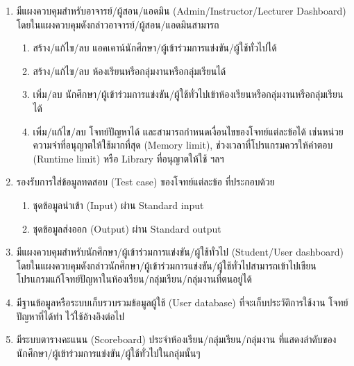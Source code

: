 \documentclass[12pt,one side,openright,a4paper]{cpe-thesis-th}
\begin{document}
\begin{enumerate}
    \item มีแผงควบคุมสำหรับอาจารย์/ผู้สอน/แอดมิน (Admin/Instructor/Lecturer Dashboard) โดยในแผงควบคุมดังกล่าวอาจารย์/ผู้สอน/แอดมินสามารถ
    \begin{enumerate}
        \item สร้าง/แก้ไข/ลบ แอคเคาน์นักศึกษา/ผู้เข้าร่วมการแข่งขัน/ผู้ใช้ทั่วไปได้
        \item สร้าง/แก้ไข/ลบ ห้องเรียนหรือกลุ่มงานหรือกลุ่มเรียนได้
        \item เพิ่ม/ลบ นักศึกษา/ผู้เข้าร่วมการแข่งขัน/ผู้ใช้ทั่วไปเข้าห้องเรียนหรือกลุ่มงานหรือกลุ่มเรียนได้
        \item เพิ่ม/แก้ไข/ลบ โจทย์ปัญหาได้ และสามารถกำหนดเงื่อนไขของโจทย์แต่ละข้อได้ เช่นหน่วยความจำที่อนุญาตให้ใช้มากที่สุด (Memory limit), ช่วงเวลาที่โปรแกรมควรให้คำตอบ (Runtime limit) หรือ Library ที่อนุญาตให้ใช้ ฯลฯ
    \end{enumerate}
    \item รองรับการใส่ข้อมูลทดสอบ (Test case) ของโจทย์แต่ละข้อ ที่ประกอบด้วย
    \begin{enumerate}
        \item ชุดข้อมูลนำเข้า (Input) ผ่าน Standard input
        \item ชุดข้อมูลส่งออก (Output) ผ่าน Standard output
    \end{enumerate}
    \item มีแผงควบคุมสำหรับนักศึกษา/ผู้เข้าร่วมการแข่งขัน/ผู้ใช้ทั่วไป (Student/User dashboard) โดยในแผงควบคุมดังกล่าวนักศึกษา/ผู้เข้าร่วมการแข่งขัน/ผู้ใช้ทั่วไปสามารถเข้าไปเขียนโปรแกรมแก้โจทย์ปัญหาในห้องเรียน/กลุ่มเรียน/กลุ่มงานที่ตนอยู่ได้
    \item มีฐานข้อมูลหรือระบบเก็บรวบรวมข้อมูลผู้ใช้ (User database) ที่จะเก็บประวัติการใช้งาน โจทย์ปัญหาที่ได้ทำ ไว้ใช้อ้างอิงต่อไป
    \item มีระบบตารางคะแนน (Scoreboard) ประจำห้องเรียน/กลุ่มเรียน/กลุ่มงาน ที่แสดงลำดับของนักศึกษา/ผู้เข้าร่วมการแข่งขัน/ผู้ใช้ทั่วไปในกลุ่มนั้นๆ
\end{enumerate}
\end{document}
